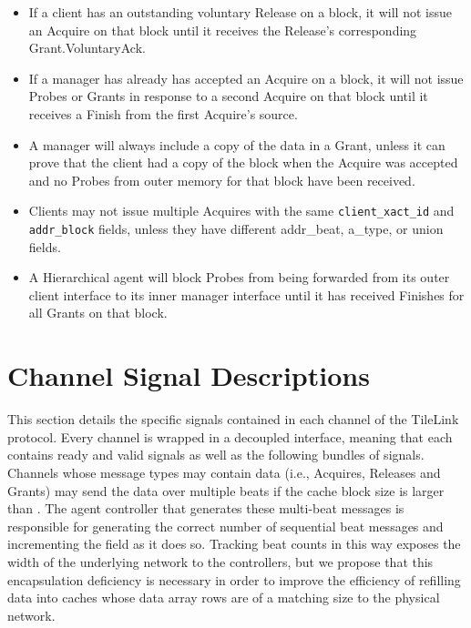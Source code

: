 \begin{itemize}
\item If a client has an outstanding voluntary Release on a block, it will not issue an Acquire on that block until it receives the Release's corresponding Grant.VoluntaryAck.
\item If a manager has already has accepted an Acquire on a block, it will not issue Probes or Grants in response to a second Acquire on that block until it receives a Finish from the first Acquire's source.
\item A manager will always include a copy of the data in a Grant, unless it can prove that the client had a copy of the block when the Acquire was accepted and no Probes from outer memory for that block have been received.
\item Clients may not issue multiple Acquires with the same {\tt client\_xact\_id} and {\tt addr\_block} fields, unless they have different {addr\_beat}, {a\_type}, or {union} fields.
\item A Hierarchical agent will block Probes from being forwarded from its outer client interface to its inner manager interface until it has received Finishes for all Grants on that block.
\end{itemize}

\section{Channel Signal Descriptions}
\label{s.types}

This section details the specific signals contained in each channel of the TileLink protocol.
Every channel is wrapped in a decoupled interface, meaning that each contains ready and valid signals as well as the following bundles of signals.
Channels whose message types may contain data (i.e., Acquires, Releases and Grants) may send the data over multiple beats
if the cache block size is larger than .
The agent controller that generates these multi-beat messages is responsible for generating the correct number of sequential beat messages and incrementing the  field as it does so.
Tracking beat counts in this way exposes the width of the underlying network to the controllers, 
but we propose that this encapsulation deficiency is necessary in order to improve the efficiency of refilling data into caches whose data array rows are of a matching size to the physical network.



